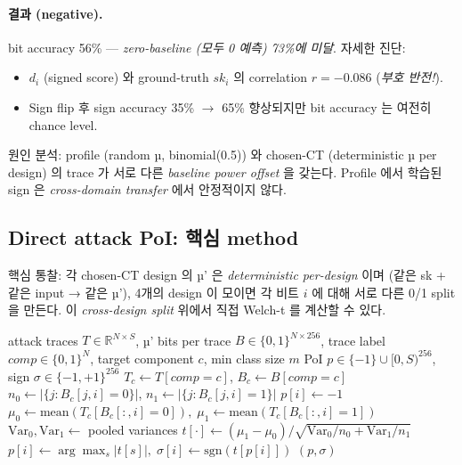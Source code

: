 \documentclass[11pt]{article}
\theoremstyle{plain}
\theoremstyle{definition}
\theoremstyle{remark}
\begin{document}
\paragraph{결과 (negative).} bit accuracy 56\% — \emph{zero-baseline (모두 0
예측) 73\%에 미달}. 자세한 진단:
\begin{itemize}[leftmargin=*]
\item $d_i$ (signed score) 와 ground-truth $sk_i$ 의 correlation $r = -0.086$
   (\emph{부호 반전!}).
\item Sign flip 후 sign accuracy 35\% $\to$ 65\% 향상되지만 bit accuracy 는
   여전히 chance level.
\end{itemize}

원인 분석: profile (random µ, binomial(0.5)) 와 chosen-CT (deterministic µ
per design) 의 trace 가 서로 다른 \emph{baseline power offset} 을 갖는다.
Profile 에서 학습된 sign 은 \emph{cross-domain transfer} 에서 안정적이지
않다.

\subsection{Direct attack PoI: 핵심 method}

핵심 통찰: 각 chosen-CT design 의 µ' 은 \emph{deterministic per-design} 이며
(같은 sk + 같은 input → 같은 µ'), 4개의 design 이 모이면 각 비트 $i$ 에 대해
서로 다른 0/1 split 을 만든다. 이 \emph{cross-design split} 위에서 직접
Welch-t 를 계산할 수 있다.

\begin{algorithm}[h!]
\caption{Direct attack PoI 학습 (component-specific)}
\label{alg:directpoi}
\begin{algorithmic}[1]
\Require attack traces $T \in \mathbb{R}^{N \times S}$, µ' bits per trace $B \in \{0,1\}^{N \times 256}$,
   trace label $\mathit{comp} \in \{0, 1\}^N$, target component $c$, min class size $m$
\Ensure PoI $p \in \{-1\} \cup [0, S)^{256}$, sign $\sigma \in \{-1, +1\}^{256}$
\State $T_c \gets T[\mathit{comp} = c]$,\; $B_c \gets B[\mathit{comp} = c]$
\State $n_0 \gets |\{j: B_c[j, i] = 0\}|$,\; $n_1 \gets |\{j: B_c[j, i] = 1\}|$
   \State $p[i] \gets -1$ 
\Else
   \State $\mu_0 \gets \mathrm{mean}(T_c[B_c[:, i] = 0]),\; \mu_1 \gets \mathrm{mean}(T_c[B_c[:, i] = 1])$
   \State $\mathrm{Var}_0, \mathrm{Var}_1 \gets$ pooled variances
   \State $t[\cdot] \gets (\mu_1 - \mu_0) / \sqrt{\mathrm{Var}_0 / n_0 + \mathrm{Var}_1 / n_1}$
   \State $p[i] \gets \arg\max_s |t[s]|,\; \sigma[i] \gets \mathrm{sgn}(t[p[i]])$
\EndIf
\EndFor
\Return $(p, \sigma)$
\end{algorithmic}
\end{algorithm}
\end{document}
